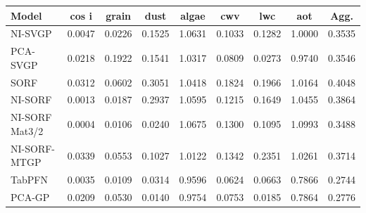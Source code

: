 \begin{tabular}{lcccccccc}
\toprule
Model & cos i & grain & dust & algae & cwv & lwc & aot & Agg. \\
\midrule
NI-SVGP & 0.0047 & 0.0226 & 0.1525 & 1.0631 & 0.1033 & 0.1282 & 1.0000 & 0.3535 \\
PCA-SVGP & 0.0218 & 0.1922 & 0.1541 & 1.0317 & 0.0809 & 0.0273 & 0.9740 & 0.3546 \\
SORF & 0.0312 & 0.0602 & 0.3051 & 1.0418 & 0.1824 & 0.1966 & 1.0164 & 0.4048 \\
NI-SORF & 0.0013 & 0.0187 & 0.2937 & 1.0595 & 0.1215 & 0.1649 & 1.0455 & 0.3864 \\
NI-SORF Mat3/2 & 0.0004 & 0.0106 & 0.0240 & 1.0675 & 0.1300 & 0.1095 & 1.0993 & 0.3488 \\
NI-SORF-MTGP & 0.0339 & 0.0553 & 0.1027 & 1.0122 & 0.1342 & 0.2351 & 1.0261 & 0.3714 \\
TabPFN & 0.0035 & 0.0109 & 0.0314 & 0.9596 & 0.0624 & 0.0663 & 0.7866 & 0.2744 \\
PCA-GP & 0.0209 & 0.0530 & 0.0140 & 0.9754 & 0.0753 & 0.0185 & 0.7864 & 0.2776 \\
\bottomrule
\end{tabular}